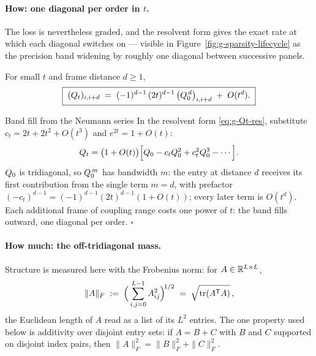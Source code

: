 \paragraph{How: one diagonal per order in $t$.} The loss is nevertheless
graded, and the resolvent form gives the exact rate at which each diagonal
switches on --- visible in Figure~\ref{fig:g-sparsity-lifecycle} as the
precision band widening by roughly one diagonal between successive panels.

\begin{theorem}\label{thm:g-bandfill}
For small $t$ and frame distance $d \geq 1$,
\begin{equation}
  \boxed{\;
  (Q_t)_{i, i+d}
  \;=\; (-1)^{d-1}\, (2t)^{d-1}\, \big( Q_0^{\,d} \big)_{i, i+d}
  \;+\; O(t^{d}) .
  \;}
  \label{eq:g-bandfill}
\end{equation}
\end{theorem}

\begin{toolbox}{Band fill from the Neumann series}
In the resolvent form \eqref{eq:g-Qt-res}, substitute
$c_t = 2t + 2t^2 + O(t^3)$ and $e^{2t} = 1 + O(t)$:
\begin{equation*}
  Q_t = \big(1 + O(t)\big)
  \Big[ Q_0 - c_t Q_0^2 + c_t^2 Q_0^3 - \cdots \Big].
\end{equation*}
$Q_0$ is tridiagonal, so $Q_0^{\,m}$ has bandwidth $m$: the entry at
distance $d$ receives its first contribution from the single term $m = d$,
with prefactor $(-c_t)^{d-1} = (-1)^{d-1}(2t)^{d-1}(1 + O(t))$; every
later term is $O(t^d)$. Each additional frame of coupling range costs one
power of $t$: the band fills outward, one diagonal per order.
\hfill$\square$
\end{toolbox}


\paragraph{How much: the off-tridiagonal mass.}
Structure is measured here with the Frobenius norm: for $A \in \mathbb{R}^{L\times L}$,
\begin{equation}
  \|A\|_F \;:=\; \Big(\sum_{i,j=0}^{L-1} A_{ij}^2\Big)^{\!1/2}
  \;=\; \sqrt{\operatorname{tr}(A^{\mathsf{T}} A)}\, ,
  \label{eq:g-frob}
\end{equation}
the Euclidean length of $A$ read as a list of its $L^2$ entries. The one
property used below is additivity over disjoint entry sets: if $A = B + C$ with
$B$ and $C$ supported on disjoint index pairs, then
$\|A\|_F^2 = \|B\|_F^2 + \|C\|_F^2$.

